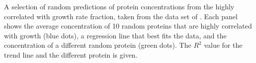 \label{fig:randpred}
  A selection of random predictions of protein concentrations from the highly correlated with growth rate fraction, taken from the data set of \cite{Heinemann2015}.
  Each panel shows the average concentration of 10 random proteins that are highly correlated with growth (blue dots), a regression line that best fits the data, and the concentration of a different random protein (green dots).
  The $R^2$ value for the trend line and the different protein is given.
